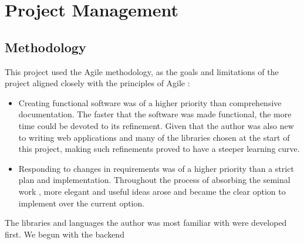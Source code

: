 \section{Project Management}

\subsection{Methodology}
This project used the Agile methodology, as the goals and limitations of the project aligned closely with the principles of Agile \cite{agilePrinciples}:
\begin{itemize}
    \item Creating functional software was of a higher priority than comprehensive documentation. The faster that the software was made functional, the more time could be devoted to its refinement. Given that the author was also new to writing web applications and many of the libraries chosen at the start of this project, making such refinements proved to have a steeper learning curve.
    \item Responding to changes in requirements was of a higher priority than a strict plan and implementation. Throughout the process of absorbing the seminal work \cite{chistikov2020re}, more elegant and useful ideas arose and became the clear option to implement over the current option.
\end{itemize}
\noindent The libraries and languages the author was most familiar with were developed first. We begun with the backend